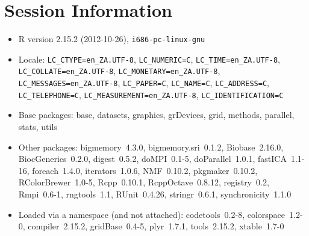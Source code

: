 \documentclass[10pt]{article}
\begin{document}
\section*{Session Information}
\begin{itemize}\raggedright
  \item R version 2.15.2 (2012-10-26), \verb|i686-pc-linux-gnu|
  \item Locale: \verb|LC_CTYPE=en_ZA.UTF-8|, \verb|LC_NUMERIC=C|, \verb|LC_TIME=en_ZA.UTF-8|, \verb|LC_COLLATE=en_ZA.UTF-8|, \verb|LC_MONETARY=en_ZA.UTF-8|, \verb|LC_MESSAGES=en_ZA.UTF-8|, \verb|LC_PAPER=C|, \verb|LC_NAME=C|, \verb|LC_ADDRESS=C|, \verb|LC_TELEPHONE=C|, \verb|LC_MEASUREMENT=en_ZA.UTF-8|, \verb|LC_IDENTIFICATION=C|
  \item Base packages: base, datasets, graphics, grDevices, grid,
    methods, parallel, stats, utils
  \item Other packages: bigmemory~4.3.0, bigmemory.sri~0.1.2,
    Biobase~2.16.0, BiocGenerics~0.2.0, digest~0.5.2, doMPI~0.1-5,
    doParallel~1.0.1, fastICA~1.1-16, foreach~1.4.0, iterators~1.0.6,
    NMF~0.10.2, pkgmaker~0.10.2, RColorBrewer~1.0-5, Rcpp~0.10.1,
    RcppOctave~0.8.12, registry~0.2, Rmpi~0.6-1, rngtools~1.1,
    RUnit~0.4.26, stringr~0.6.1, synchronicity~1.1.0
  \item Loaded via a namespace (and not attached): codetools~0.2-8,
    colorspace~1.2-0, compiler~2.15.2, gridBase~0.4-5, plyr~1.7.1,
    tools~2.15.2, xtable~1.7-0
\end{itemize}
\end{document}
